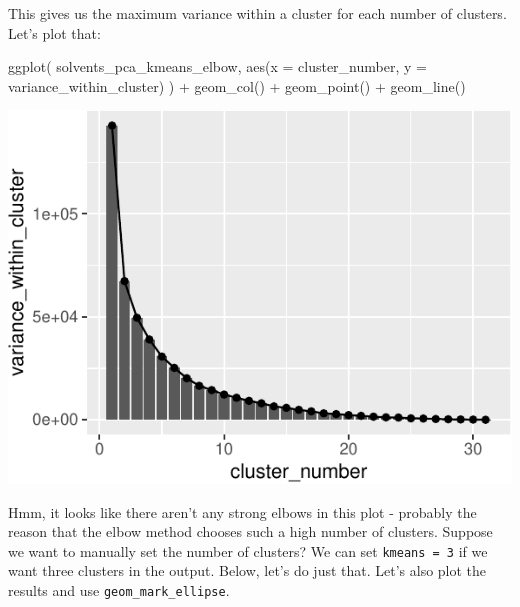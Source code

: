 \documentclass[
]{krantz}
\newenvironment{Shaded}{\begin{snugshade}}{\end{snugshade}}
\newcommand{\AttributeTok}[1]{\textcolor[rgb]{0.77,0.63,0.00}{#1}}
\newcommand{\FunctionTok}[1]{\textcolor[rgb]{0.00,0.00,0.00}{#1}}
\newcommand{\NormalTok}[1]{#1}
\newcommand{\SpecialCharTok}[1]{\textcolor[rgb]{0.00,0.00,0.00}{#1}}
\begin{document}
This gives us the maximum variance within a cluster for each number of clusters. Let's plot that:

\begin{Shaded}
\begin{Highlighting}[]
\FunctionTok{ggplot}\NormalTok{(}
\NormalTok{  solvents\_pca\_kmeans\_elbow,}
  \FunctionTok{aes}\NormalTok{(}\AttributeTok{x =}\NormalTok{ cluster\_number, }\AttributeTok{y =}\NormalTok{ variance\_within\_cluster)}
\NormalTok{) }\SpecialCharTok{+}
  \FunctionTok{geom\_col}\NormalTok{() }\SpecialCharTok{+}
  \FunctionTok{geom\_point}\NormalTok{() }\SpecialCharTok{+}
  \FunctionTok{geom\_line}\NormalTok{()}
\end{Highlighting}
\end{Shaded}

\begin{center}\includegraphics[width=1\linewidth]{index_files/figure-latex/unnamed-chunk-109-1} \end{center}

Hmm, it looks like there aren't any strong elbows in this plot - probably the reason that the elbow method chooses such a high number of clusters. Suppose we want to manually set the number of clusters? We can set \texttt{kmeans\ =\ 3} if we want three clusters in the output. Below, let's do just that. Let's also plot the results and use \texttt{geom\_mark\_ellipse}.
\end{document}
